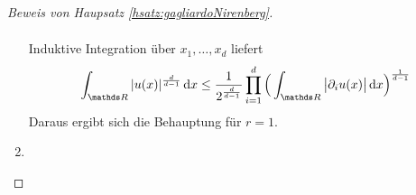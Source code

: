 \begin{proof}[Beweis von Haupsatz \ref{hsatz:gagliardoNirenberg}]
\begin{enumerate}
\begin{align*}
      \end{align*}
      Induktive Integration über $x_1,\dots,x_d$ liefert
      \begin{align*}
        \int_{\R} |u(x)|^{\frac{d}{d - 1}} \d x \leq \frac{1}{2^{\frac{d}{d - 1}}} \prod_{i = 1}^d \Big( \int_{\R} \big|\partial_i u(x) \big| \d x \Big)^{\frac{1}{d - 1}}
      \end{align*}
      Daraus ergibt sich die Behauptung für $r = 1$.
    \item 
  \end{enumerate}

\end{proof}

